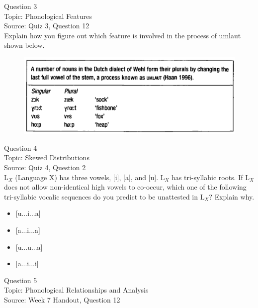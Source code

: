 \documentclass[12pt]{article}
\begin{document}
\newpage

{\large Question 3}\\

Topic: Phonological Features\\
Source: Quiz 3, Question 12\\

Explain how you figure out which feature is involved in the process of umlaut shown below.\\

\begin{figure}[H]
\includegraphics{../images/dutch.png}
\end{figure}

\newpage

{\large Question 4}\\

Topic: Skewed Distributions\\
Source: Quiz 4, Question 2\\

L$_X$ (Language X) has three vowels, [i], [a], and [u]. L$_X$ has tri-syllabic roots. If L$_X$ does not allow non-identical high vowels to co-occur, which one of the following tri-syllabic vocalic sequences do you predict to be unattested in L$_X$? Explain why.\\

\begin{itemize} \item {[u...i...a]} \item {[a...i...a]} \item {[u...u...a]} \item {[a...i...i]} \end{itemize}


\newpage

{\large Question 5}\\

Topic: Phonological Relationships and Analysis\\
Source: Week 7 Handout, Question 12\\
\end{document}
